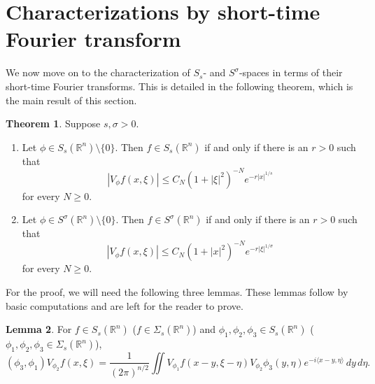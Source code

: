 \documentclass[11pt,a4paper,reqno]{amsart}
\numberwithin{equation}{section}
\theoremstyle{definition}
\newtheorem{thm}{Theorem}[section]
\newtheorem{lemma}[thm]{Lemma}
\theoremstyle{definition}
\begin{document}
\section{Characterizations by short-time Fourier transform}\label{sec:stft}
We now move on to the characterization of $S_s$- and $S^\sigma$-spaces in terms of their short-time Fourier transforms. This is detailed in the following theorem, which is the main result of this section.
\begin{thm}\label{thm:SsSTFT}
Suppose $s,\sigma> 0$.
\begin{enumerate}[label=(\roman*)]
    \item Let $\phi\in S_s(\mathbb{R}^n)\setminus\{0\}$. Then $f\in S_s(\mathbb{R}^n)$ if and only if there is an $r>0$ such that 
        \begin{equation}\label{eq:STFT3}
            |V_\phi f(x,\xi) | \leq C_N (1+|\xi|^2)^{-N} e^{- r |x|^{1/s}}
        \end{equation}
        for every $N\geq 0$.
     \item Let $\phi\in S^\sigma(\mathbb{R}^n)\setminus\{0\}$. Then $f\in S^\sigma(\mathbb{R}^n)$ if and only if there is an $r>0$ such that
        \begin{equation}\label{eq:STFT4}
            |V_{\phi} f(x,\xi) | \leq C_N (1+|x|^2)^{-N} e^{- r |\xi|^{1/\sigma}}
        \end{equation}
        for every $N\geq 0$.
\end{enumerate}
\end{thm}
For the proof, we will need the following three lemmas. These lemmas follow by basic computations and are left for the reader to prove.
\begin{lemma}\label{lem:twistconv}
For $f\in S_s(\mathbb{R}^n)$ ($f\in\Sigma_s(\mathbb{R}^n)$) and $\phi_1,\phi_2,\phi_3 \in S_s(\mathbb{R}^n)$ ($\phi_1,\phi_2,\phi_3 \in \Sigma_s(\mathbb{R}^n)$),
\begin{equation*}
    (\phi_3,\phi_1) V_{\phi_2} f(x,\xi) = \frac{1}{(2\pi)^{n/2}} \iint V_{\phi_1}f(x-y,\xi-\eta) V_{\phi_2} \phi_3 (y,\eta) e^{-i\langle x-y,\eta \rangle} \, d y \, d \eta.
\end{equation*}
\end{lemma}
\end{document}
